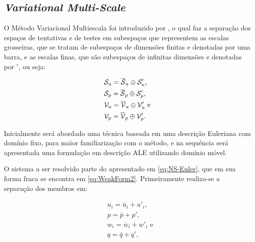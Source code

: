 \documentclass[_ArquivoPrincipal.tex]{subfiles}
\begin{document}
\subsection{\textit{Variational Multi-Scale}} \label{VMS}

O Método Variacional Multiescala foi introduzido por , o qual faz a separação dos espaços de tentativas e de testes em subespaços que representem as escalas grosseiras, que se tratam de subespaços de dimensões finitas e denotadas por uma barra, e as escalas finas, que são subespaços de infinitas dimensões e denotadas por $'$, ou seja:

\begin{subequations}
    \begin{align}
         & \mathcal{S}_u=\overline{\mathcal{S}}_u\oplus\mathcal{S}'_u\text{,}  \\
         & \mathcal{S}_p=\overline{\mathcal{S}}_p\oplus\mathcal{S}'_p\text{,}  \\
         & \mathcal{V}_u=\overline{\mathcal{V}}_u\oplus\mathcal{V}'_u\text{ e} \\
         & \mathcal{V}_p=\overline{\mathcal{V}}_p\oplus\mathcal{V}'_p\text{.}
    \end{align}
\end{subequations}

Inicialmente será abordado uma técnica baseada em uma descrição Euleriana com domínio fixo, para maior familiarização com o método, e na sequência será apresentada uma formulação em descrição ALE utilizando domínio móvel.

O sistema a ser resolvido parte do apresentado em \ref{eq:NS-Euler}, que em sua forma fraca se encontra em \ref{eq:WeakForm2}. Primeiramente realiza-se a separação dos membros em:

\begin{subequations}
    \begin{align}
         & u_i=\bar{u}_i+u'_i\text{,}  \\
         & p=\bar{p}+p'\text{,}        \\
         & w_i=\bar{w}_i+w'_i\text{ e} \\
         & q=\bar{q}+q'\text{,}
    \end{align}
\end{subequations}
\end{document}
